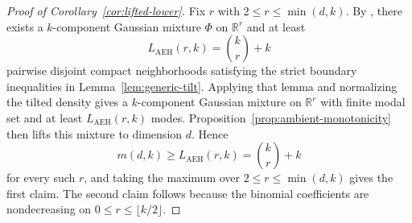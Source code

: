 \documentclass[11pt]{article}
\theoremstyle{plain}
\theoremstyle{definition}
\theoremstyle{remark}
\numberwithin{equation}{section}
\newcommand{\R}{\mathbb{R}}
\begin{document}
\begin{proof}[Proof of Corollary~\ref{cor:lifted-lower}]
Fix $r$ with $2\le r\le \min(d,k)$. By \citet[Theorem~4.1 and its proof]{AmendolaEngstromHaase2019}, there exists a $k$-component Gaussian mixture $\Phi$ on $\R^r$ and at least
\[
L_{\mathrm{AEH}}(r,k)=\binom{k}{r}+k
\]
pairwise disjoint compact neighborhoods satisfying the strict boundary inequalities in Lemma~\ref{lem:generic-tilt}. Applying that lemma and normalizing the tilted density gives a $k$-component Gaussian mixture on $\R^r$ with finite modal set and at least $L_{\mathrm{AEH}}(r,k)$ modes. Proposition~\ref{prop:ambient-monotonicity} then lifts this mixture to dimension $d$. Hence
\[
m(d,k)\ge L_{\mathrm{AEH}}(r,k)=\binom{k}{r}+k
\]
for every such $r$, and taking the maximum over $2\le r\le \min(d,k)$ gives the first claim. The second claim follows because the binomial coefficients are nondecreasing on $0\le r\le \lfloor k/2\rfloor$.
\end{proof}
\end{document}
